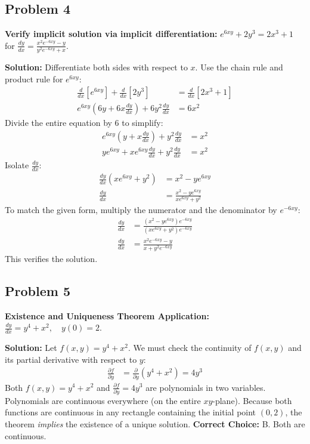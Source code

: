 \documentclass[12pt]{article}
\begin{document}
\subsection*{Problem 4}
\textbf{Verify implicit solution via implicit differentiation:} $e^{6xy} + 2y^3 = 2x^3 + 1$ for $\frac{dy}{dx} = \frac{x^2e^{-6xy} - y}{y^2e^{-6xy} + x}$.

\textbf{Solution:}
Differentiate both sides with respect to $x$. Use the chain rule and product rule for $e^{6xy}$:
\begin{align*}
    \frac{d}{dx} \left[ e^{6xy} \right] + \frac{d}{dx} \left[ 2y^3 \right] &= \frac{d}{dx} \left[ 2x^3 + 1 \right] \\
    e^{6xy} \left( 6y + 6x \frac{dy}{dx} \right) + 6y^2 \frac{dy}{dx} &= 6x^2
\end{align*}
Divide the entire equation by 6 to simplify:
\begin{align*}
    e^{6xy} \left( y + x \frac{dy}{dx} \right) + y^2 \frac{dy}{dx} &= x^2 \\
    ye^{6xy} + xe^{6xy}\frac{dy}{dx} + y^2\frac{dy}{dx} &= x^2
\end{align*}
Isolate $\frac{dy}{dx}$:
\begin{align*}
    \frac{dy}{dx} \left( xe^{6xy} + y^2 \right) &= x^2 - ye^{6xy} \\
    \frac{dy}{dx} &= \frac{x^2 - ye^{6xy}}{xe^{6xy} + y^2}
\end{align*}
To match the given form, multiply the numerator and the denominator by $e^{-6xy}$:
\begin{align*}
    \frac{dy}{dx} &= \frac{(x^2 - ye^{6xy})e^{-6xy}}{(xe^{6xy} + y^2)e^{-6xy}} \\
    \frac{dy}{dx} &= \frac{x^2e^{-6xy} - y}{x + y^2e^{-6xy}}
\end{align*}
This verifies the solution.

\subsection*{Problem 5}
\textbf{Existence and Uniqueness Theorem Application:} $\frac{dy}{dx} = y^4 + x^2, \quad y(0)=2$.

\textbf{Solution:}
Let $f(x, y) = y^4 + x^2$. We must check the continuity of $f(x,y)$ and its partial derivative with respect to $y$:
\begin{align*}
    \frac{\partial f}{\partial y} &= \frac{\partial}{\partial y} (y^4 + x^2) = 4y^3
\end{align*}
Both $f(x, y) = y^4 + x^2$ and $\frac{\partial f}{\partial y} = 4y^3$ are polynomials in two variables. Polynomials are continuous everywhere (on the entire $xy$-plane). Because both functions are continuous in any rectangle containing the initial point $(0, 2)$, the theorem \textit{implies} the existence of a unique solution.
\textbf{Correct Choice:} B. Both are continuous.
\end{document}
